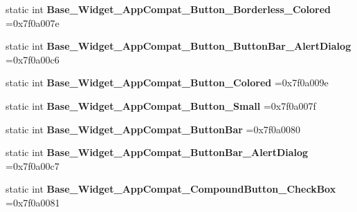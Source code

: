 \begin{DoxyCompactItemize}
static int {\bfseries Base\+\_\+\+Widget\+\_\+\+App\+Compat\+\_\+\+Button\+\_\+\+Borderless\+\_\+\+Colored} =0x7f0a007e
\item 
\mbox{\label{classandroid_1_1support_1_1graphics_1_1drawable_1_1R_1_1style_a34447dcd93cd06a57b1a13cd7f1d757a}} 
static int {\bfseries Base\+\_\+\+Widget\+\_\+\+App\+Compat\+\_\+\+Button\+\_\+\+Button\+Bar\+\_\+\+Alert\+Dialog} =0x7f0a00c6
\item 
\mbox{\label{classandroid_1_1support_1_1graphics_1_1drawable_1_1R_1_1style_a73b761c7ee00272e17fa5ae766ec2bfa}} 
static int {\bfseries Base\+\_\+\+Widget\+\_\+\+App\+Compat\+\_\+\+Button\+\_\+\+Colored} =0x7f0a009e
\item 
\mbox{\label{classandroid_1_1support_1_1graphics_1_1drawable_1_1R_1_1style_ad2fb6a66349a6f5cd4e3dfba2a363b18}} 
static int {\bfseries Base\+\_\+\+Widget\+\_\+\+App\+Compat\+\_\+\+Button\+\_\+\+Small} =0x7f0a007f
\item 
\mbox{\label{classandroid_1_1support_1_1graphics_1_1drawable_1_1R_1_1style_a5ccfdd463a5e0b5c6192d7069715467b}} 
static int {\bfseries Base\+\_\+\+Widget\+\_\+\+App\+Compat\+\_\+\+Button\+Bar} =0x7f0a0080
\item 
\mbox{\label{classandroid_1_1support_1_1graphics_1_1drawable_1_1R_1_1style_a33f2d9df18a7d841ca849ef2cf1f4a65}} 
static int {\bfseries Base\+\_\+\+Widget\+\_\+\+App\+Compat\+\_\+\+Button\+Bar\+\_\+\+Alert\+Dialog} =0x7f0a00c7
\item 
\mbox{\label{classandroid_1_1support_1_1graphics_1_1drawable_1_1R_1_1style_a6e10963d822fc6292604f01c8c0b8dbe}} 
static int {\bfseries Base\+\_\+\+Widget\+\_\+\+App\+Compat\+\_\+\+Compound\+Button\+\_\+\+Check\+Box} =0x7f0a0081
\item 
\mbox{\label{classandroid_1_1support_1_1graphics_1_1drawable_1_1R_1_1style_aa84ee7c4903f6a5befa4d8d9d2cc5e3a}} 

\end{DoxyCompactItemize}
